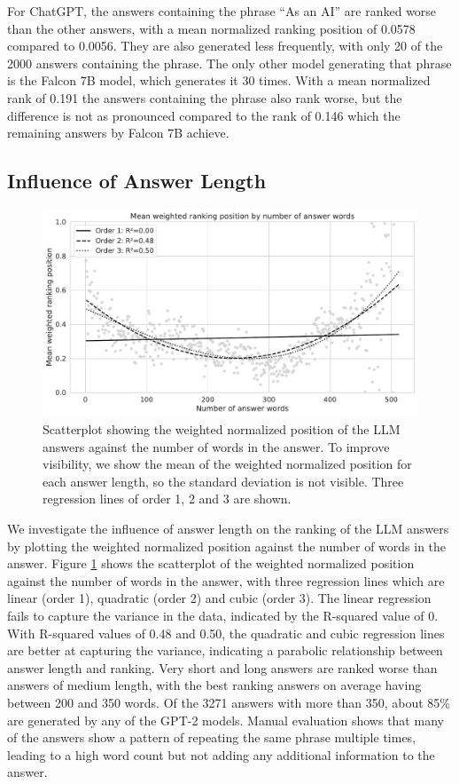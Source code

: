 For ChatGPT, the answers containing the phrase ``As an AI'' are ranked worse than the other answers, with a mean normalized ranking position of 0.0578 compared to 0.0056.
They are also generated less frequently, with only 20 of the 2000 answers containing the phrase.
The only other model generating that phrase is the Falcon 7B model, which generates it 30 times.
With a mean normalized rank of 0.191 the answers containing the phrase also rank worse, but the difference is not as pronounced compared to the rank of 0.146 which the remaining answers by Falcon 7B achieve.

\subsection{Influence of Answer Length}
\begin{figure}
    \centering
    \includegraphics[width=\textwidth]{images/weighted_position_vs_num_answer_words.pdf}
    \caption{Scatterplot showing the weighted normalized position of the LLM answers against the number of words in the answer. 
    To improve visibility, we show the mean of the weighted normalized position for each answer length, so the standard deviation is not visible.
     Three regression lines of order 1, 2 and 3 are shown.}
    \label{fig:weighted_position_vs_answer_length}
\end{figure}
We investigate the influence of answer length on the ranking of the LLM answers by plotting the weighted normalized position against the number of words in the answer.
Figure \ref{fig:weighted_position_vs_answer_length} shows the scatterplot of the weighted normalized position against the number of words in the answer, with three regression lines which are linear (order 1), quadratic (order 2) and cubic (order 3).
The linear regression fails to capture the variance in the data, indicated by the R-squared value of 0.
With R-squared values of 0.48 and 0.50, the quadratic and cubic regression lines are better at capturing the variance, indicating a parabolic relationship between answer length and ranking.
Very short and long answers are ranked worse than answers of medium length, with the best ranking answers on average having between 200 and 350 words.
Of the 3271 answers with more than 350, about 85\% are generated by any of the GPT-2 models.
Manual evaluation shows that many of the answers show a pattern of repeating the same phrase multiple times, leading to a high word count but not adding any additional information to the answer.

